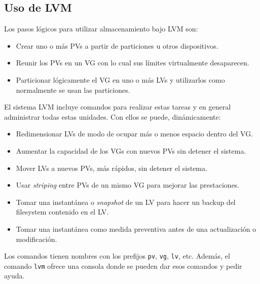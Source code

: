 \subsection {Uso de LVM}
Los pasos lógicos para utilizar almacenamiento bajo LVM son: 
\begin{itemize}
	\item Crear uno o más PVs a partir de particiones u otros dispositivos.
	\item Reunir los PVs en un VG con lo cual sus límites virtualmente desaparecen.
	\item Particionar lógicamente el VG en uno o más LVs y utilizarlos como normalmente se usan las particiones.
\end{itemize}

El sistema LVM incluye comandos para realizar estas tareas y en general administrar todas estas unidades. Con ellos se puede, dinámicamente:
\begin{itemize}
	\item Redimensionar LVs de modo de ocupar más o menos espacio dentro del VG.
	\item Aumentar la capacidad de los VGs con nuevos PVs sin detener el sistema.
	\item Mover LVs a nuevos PVs, más rápidos, sin detener el sistema.
	\item Usar \emph{striping} entre PVs de un mismo VG para mejorar las prestaciones.
	\item Tomar una instantánea o \emph{snapshot} de un LV para hacer un backup del filesystem contenido en el LV.
	\item Tomar una instantánea como medida preventiva antes de una actualización o modificación.
\end{itemize}



Los comandos tienen nombres con los prefijos \lstinline$pv$, \lstinline$vg$, \lstinline$lv$, etc. Además, el comando \lstinline$lvm$ ofrece una consola donde se pueden dar esos comandos y pedir ayuda.

	



